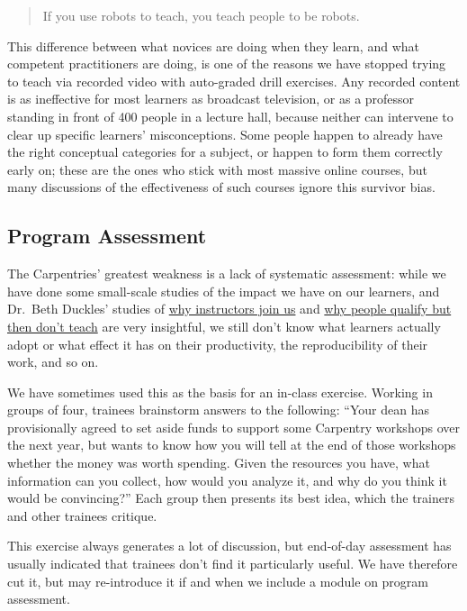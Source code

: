 \begin{quote}
If you use robots to teach, you teach people to be robots.
\end{quote}

This difference between what novices are doing when they learn, and what
competent practitioners are doing, is one of the reasons we have stopped
trying to teach via recorded video with auto-graded drill exercises. Any
recorded content is as ineffective for most learners as broadcast
television, or as a professor standing in front of 400 people in a
lecture hall, because neither can intervene to clear up specific
learners' misconceptions. Some people happen to already have the right
conceptual categories for a subject, or happen to form them correctly
early on; these are the ones who stick with most massive online courses,
but many discussions of the effectiveness of such courses ignore this
survivor bias.

\subsection{Program Assessment}\label{program-assessment}

The Carpentries' greatest weakness is a lack of systematic assessment:
while we have done some small-scale studies of the impact we have on our
learners, and Dr.~Beth Duckles' studies of
\href{\{\{\%20site.swc\_site\%20\}\}/files/bib/duckles-instructor-engagement-2016.pdf}{why
instructors join us} and
\href{\{\{\%20site.swc\_site\%20\}\}/files/bib/duckles-non-instructor-report-2016.pdf}{why
people qualify but then don't teach} are very insightful, we still don't
know what learners actually adopt or what effect it has on their
productivity, the reproducibility of their work, and so on.

We have sometimes used this as the basis for an in-class exercise.
Working in groups of four, trainees brainstorm answers to the following:
``Your dean has provisionally agreed to set aside funds to support some
Carpentry workshops over the next year, but wants to know how you will
tell at the end of those workshops whether the money was worth spending.
Given the resources you have, what information can you collect, how
would you analyze it, and why do you think it would be convincing?''
Each group then presents its best idea, which the trainers and other
trainees critique.

This exercise always generates a lot of discussion, but end-of-day
assessment has usually indicated that trainees don't find it
particularly useful. We have therefore cut it, but may re-introduce it
if and when we include a module on program assessment.
